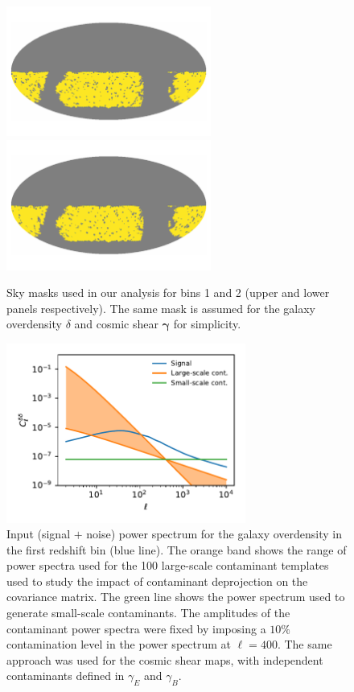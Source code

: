 \documentclass[a4paper,11pt]{article}
\begin{document}
      \begin{figure}
        \centering
        \includegraphics[width=0.6\textwidth]{./figures/mask-lss1.pdf}
        \includegraphics[width=0.6\textwidth]{./figures/mask-lss2.pdf}
        \caption{Sky masks used in our analysis for bins 1 and 2 (upper and lower panels respectively). The same mask is assumed for the galaxy overdensity $\delta$ and cosmic shear $\boldsymbol{\gamma}$ for simplicity.} \label{fig:mask}
      \end{figure}
      \begin{figure}
        \centering
        \includegraphics[width=0.7\textwidth]{./figures/contaminants_cl.pdf}
        \caption{Input (signal $+$ noise) power spectrum for the galaxy overdensity in the first redshift bin (blue line). The orange band shows the range of power spectra used for the 100 large-scale contaminant templates used to study the impact of contaminant deprojection on the covariance matrix. The green line shows the power spectrum used to generate small-scale contaminants. The amplitudes of the contaminant power spectra were fixed by imposing a $10\%$ contamination level in the power spectrum at $\ell=400$. The same approach was used for the cosmic shear maps, with independent contaminants defined in $\gamma_E$ and $\gamma_B$.} \label{fig:clcont}
      \end{figure}
\end{document}
